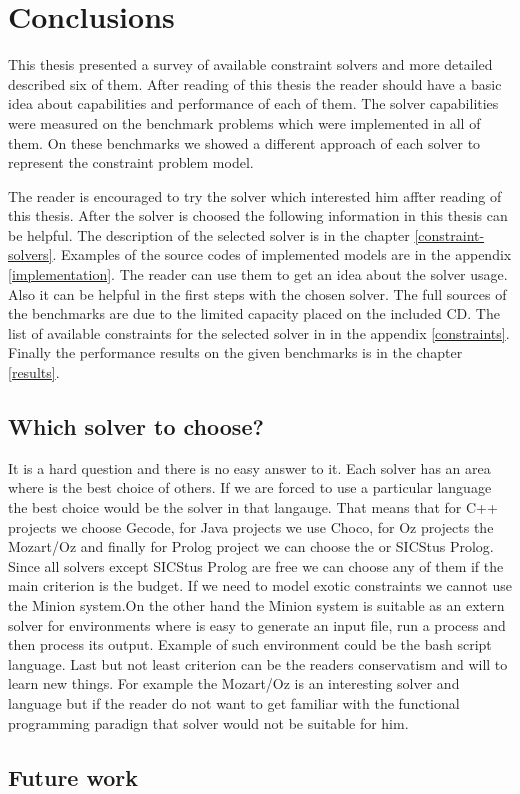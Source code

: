 \chapter{Conclusions}

This thesis presented a survey of available constraint solvers and more detailed 
described six of them. After reading of this thesis the reader should have a 
basic idea about capabilities and performance of each of them. The solver capabilities 
were measured on the benchmark problems which were implemented in all of them.
On these benchmarks we showed a different approach of each solver to represent
the constraint problem model. 

The reader is encouraged to try the solver which interested him affter reading of this thesis. 
After the solver is choosed the following information in this thesis can be helpful. 
The description of the selected solver is in the chapter \ref{constraint-solvers}.
Examples of the source codes of implemented models are in the appendix \ref{implementation}.
The reader can use them to get an idea about the solver usage. Also it can 
be helpful in the first steps with the chosen solver. The full sources of the benchmarks
are due to the limited capacity placed on the included CD. The list of available constraints
for the selected solver in in the appendix \ref{constraints}. Finally the performance results
 on the given benchmarks is in the chapter \ref{results}.
 
\section{Which solver to choose?}
It is a hard question and there is no easy answer to it. Each solver has an area where
is the best choice of others. If we are forced to use a particular language the best choice
would be the solver in that langauge. That means that for C++ projects we choose Gecode,
for Java projects we use Choco, for Oz projects the Mozart/Oz and finally for Prolog
project we can choose the \eclipse or SICStus Prolog. Since all solvers except SICStus Prolog are free
we can choose any of them if the main criterion is the budget. If we need to model 
exotic constraints we cannot use the Minion system.On the other hand the Minion system
is suitable as an extern solver for environments where is easy to generate an input
file, run a process and then process its output. Example of such environment could
be the bash script language. Last but not least criterion can be the readers conservatism and 
will to learn new things. For example the Mozart/Oz is an interesting solver and language
but if the reader do not want to get familiar with the functional programming paradign that solver would
not be suitable for him.

\section{Future work}
  